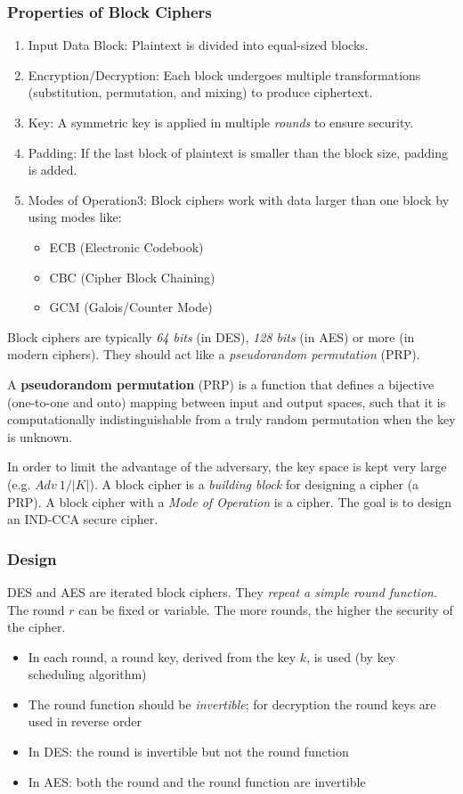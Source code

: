 \subsubsection{Properties of Block Ciphers}
\begin{enumerate}
    \item Input Data Block: Plaintext is divided into equal-sized blocks.
    \item Encryption/Decryption: Each block undergoes multiple transformations (substitution, permutation, and mixing) to produce ciphertext.
    \item Key: A symmetric key is applied in multiple \emph{rounds} to ensure security.
    \item Padding: If the last block of plaintext is smaller than the block size, padding is added.
    \item Modes of Operation3: Block ciphers work with data larger than one block by using modes like:
    \begin{itemize}
        \item ECB (Electronic Codebook)
        \item CBC (Cipher Block Chaining)
        \item GCM (Galois/Counter Mode)
    \end{itemize}
\end{enumerate}

Block ciphers are typically \emph{64 bits} (in DES), \emph{128 bits} (in AES) or more (in modern ciphers). They should act like a \emph{pseudorandom permutation} (PRP).

\begin{defn}
A \textbf{pseudorandom permutation} (PRP) is a function that defines a bijective (one-to-one and onto) mapping between input and output spaces, such that it is computationally indistinguishable from a truly random permutation when the key is unknown. 
\end{defn}

In order to limit the advantage of the adversary, the key space is kept very large (e.g. $Adv \ 1/|K|$). A block cipher is a \emph{building block} for designing a cipher (a PRP). A block cipher with a \emph{Mode of Operation} is a cipher. The goal is to design an IND-CCA secure cipher.

\subsubsection{Design}
DES and AES are iterated block ciphers. They \emph{repeat a simple round function}. The round $r$ can be fixed or variable. The more rounds, the higher the security of the cipher.
\begin{itemize}
    \item In each round, a round key, derived from the key $k$, is used (by key scheduling algorithm)
    \item The round function should be \emph{invertible}; for decryption the round keys are used in reverse order
    \item In DES: the round is invertible but not the round function
    \item In AES: both the round and the round function are invertible
\end{itemize}

